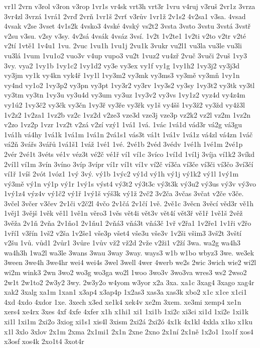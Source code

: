 {vr1l
2vrn
v3rol
v3ron
v3rop
1vr1s
vr4sk
vrt3h
vrt3r
1vru
v4ruj
v3ruš
2vr1z
3vrza
3vr4zl
3vrzá
1vrá1
2vrď
2vrň
1vr1š
2vrť
v3rův
1vr1ž
2v1s2
4v2sa1
v3sa.
4vsad
4vsak
v2se
3vset
4v1s2k
4vsko3
4vské
4vský
vs2t2
3vsta
3vsto
3vstu
3vstá
3vstř
v2su
v3su.
v2sy
v3sy.
4v2sá
4vsák
4vsáz
3vsí.
1v2t
1v2te1
1v2ti
v2to
v2tr
v2té
v2tí
1vtě1
1v4u1
1vu.
2vuc
1vu1h
1vu1j
2vu1k
3vukr
vu2l1
vu3la
vu3le
vu3li
vu3lá
1vum
1vu1o2
vuo3v
v4up
vupo3
vu2t
1vuz2
vu4zř
2vuč
3vuči
2vuš
1vy3
3vy.
vya2
1vy1b
1vy1c2
1vy1d2
vy3e
vy3ex
vy1f
vy1g
1vy1h2
1vy3j2
vy3j3d
vy3jm
vy1k
vy4kn
vyk4ř
1vy1l
1vy3m2
vy3mk
vy3ms3
vy3mě
vy3mň
1vy1n
vy4nd
vy1o2
1vy3p2
vy3pn
vy3pt
1vy3r2
vy3rv
1vy3s2
vy3sy
1vy3t2
vy3tk
vy3tl
vy3tm
vy3tn
1vy3u
vy3u4d
vy3um
vy3uz
1vy3v2
vy3vs
1vy1z2
vyz4d
vy4z4m
vy1ú2
1vy3č2
vy3čk
vy3čn
1vy3ř
vy3ře
vy3řk
vy1š
vy4šš
1vy3ž2
vy3žd
vy4ž3l
1v2z2
1v2za1
1vz2b
vz2c
1vz2d
v2ze3
vze3d
vze3j
vze3p
vz2k2
vz2l
vz2m
1vz2n
v2zo
1vz2p
1vzr
1vz2t
v2zá
v2zí
vzý1
1vá1
1vá.
1vác
1vá1d
vád3r
vá2g
vá3gu
1vá1h
vá4hy
1vá1k
1vá1m
1vá1n
2vá1s1
vás3t
vá1t
1vá1v
1vá1z
vá4zl
vá4zn
1váč
vá2ň
3vářs
3vářů
1vá1š1
1váž
1vé1
1vé.
2vé1b
2véd
3védv
1vé1h
1vé1m
2vé1p
2vér
2vé1t
3véts
vé1v
véz3t
vé2č
vé1ř
ví1
ví1c
3víco
1ví1d
1ví1j
3víja
ví1k2
3víkd
2ví1l
ví1m
3vín
3víno
3víp
3vípr
ví1r
ví1t
ví1v
ví2č
ví3ča
ví3če
ví3či
ví3čo
3ví3čí
ví1ř
1víš
2vót
1vóz1
1vý
3vý.
vý1b
1výc2
vý1d
vý1h
vý1j
vý1k2
vý1l
1vý1m
vý3mě
vý1n
vý1p
vý1r
1vý1s
výst4
vý3t2
vý3t3c
vý3t3k
vý3u2
vý3us
vý3v
vý3vo
1vý1z4
výz4v
vý1č2
vý1ř
1vý1š
výš3k
vý1ž
2vč2
3v2ča
3včas
3včat
v2če
v3če.
3včel
3včer
v3čev
2v1či
v2č2l
4včo
2v1čá
2v1čí
1vě.
2vě1c
3věcn
3věcí
věd3r
vě1h
1věj1
3vějš
1věk
vě1l
1vě1n
věro3
1věs
vět4i
vět3v
vět4í
vět3ř
vě1ř
1vě1š
2věž
3věža
2v1ň
2vňa
2v1ňo1
2v1ňu1
2vňá3
vňá3t
vňá3č
1vř
v2řa1
1v2ře1
1v1ři
v2řo
1vří1
v3řín
1vš2
v2ša
1v2še1
vše3p
všet4
vše3u
vše3v
1v2ši
všim3
3vš2t
3vští
v2šu
1vů.
vůd1
2vůr1
3vůre
1vův
vž2
vž2d
2vže
v2ži1
v2ží
3wa.
wa2g
wa4h3
wa4h3h
1wa2l
wa3le
3wans
3wau
3way
3way.
ways3
w1b
w1bo
wbyz3
3we.
we3ek
3ween
3we4h
3we4hr
wei4
wei4s
3wel
3well
4wer
4werb
we2s
2wic
3wich
wie2
wi2l
wi2m
wink3
2wn
3wo2
wo3g
wo3ga
wo2l
1woo
3wo3v
3wo3va
wres3
ws2
2wso2
2w1t
2w1to2
2w3y2
3wy.
2w3y2o
w4yom
w3yor
x2a
3xa.
xa1c
3xag4
3xago
xag4r
xak2
3xalg
xa1m
1xan1
x3ap4
x3ap4p
1x2as3
xas3a
xas3k
xbo2
x1c
x1ce
x1ci1
4xd
4xdo
4xdor
1xe.
3xech
x3ed
xe1k4
xek4v
xe2m
3xem.
xe3mi
xemp4
xe1n
xers4
xe4rx
3xes
4xf
4xfe
4xfer
x1h
x1hi1
xi1
1xi1b
1xi2c
xi3ci
xi1d
1xi2e
1xi1k
xi1l
1xi1m
2xi2o
3xiog
xi1s1
xis4l
3xism
2xi2á
2xi2ó
4x1k
4x1kl
4xkla
x1ko
x1ku
x1l
3xlo
3xlov
2x1m
2xma
2x1mi1
2x1n
2xne
2xno
2x1ní
2x1ně
1x2o1
1xo1f
xos4
x3osf
xos4k
2xo1t4
3xot4r
}
